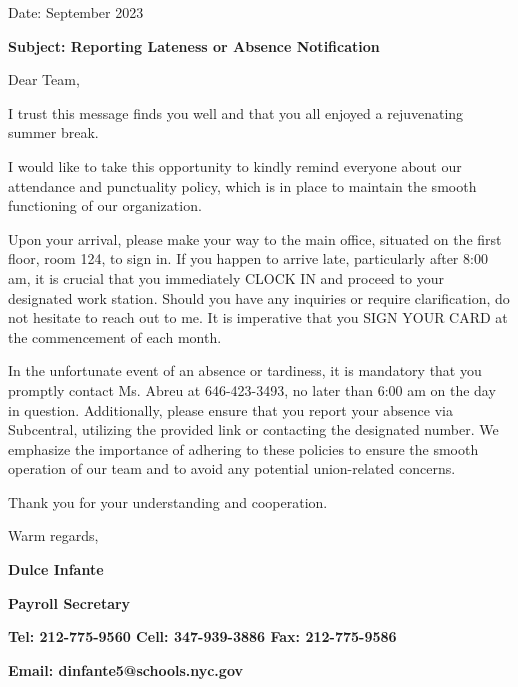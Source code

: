\documentclass[11pt,letterpaper]{article}
\author{Hilduara Abreu}
\begin{document}
\vspace*{1cm}

Date: September 2023 

\textbf{Subject: Reporting Lateness or Absence Notification}

Dear Team,

I trust this message finds you well and that you all enjoyed a rejuvenating summer break.

I would like to take this opportunity to kindly remind everyone about our attendance and punctuality policy, which is in place to maintain the smooth functioning of our organization.

Upon your arrival, please make your way to the main office, situated on the first floor, room 124, to sign in. If you happen to arrive late, particularly after 8:00 am, it is crucial that you immediately CLOCK IN and proceed to your 
designated work station. Should you have any inquiries or require clarification, do not hesitate to reach out to me. It is imperative that you SIGN YOUR CARD at the commencement of each month.

In the unfortunate event of an absence or tardiness, it is mandatory that you promptly contact Ms. Abreu at 646-423-3493, no later than 6:00 am on the day in question. Additionally, please ensure that you report your absence via
Subcentral, utilizing the provided link or contacting the designated number.
\pagebreak
\vspace*{1cm}
We emphasize the importance of adhering to these policies to ensure the smooth operation of our team and to avoid any potential union-related concerns.

Thank you for your understanding and cooperation.

Warm regards,

\begin{small}
\textbf{Dulce Infante}

\textbf{Payroll Secretary}

\textbf{Tel: 212-775-9560 Cell: 347-939-3886 Fax: 212-775-9586}

\textbf{Email: dinfante5@schools.nyc.gov}
\end{small}
\end{document}
